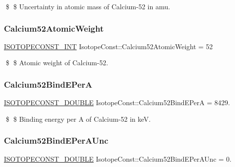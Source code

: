 \$ \$ Uncertainty in atomic mass of Calcium-\/52 in amu. \mbox{\label{group___isotope_const-_calcium-_ca52_ga20c2e65e41e31b8876894937d9915c74}} 
\subsubsection{\texorpdfstring{Calcium52\+Atomic\+Weight}{Calcium52AtomicWeight}}
{\footnotesize\ttfamily \mbox{\hyperlink{group___isotope_const-_macros_ga5f18360b3e99483a35c32d789e62621c}{I\+S\+O\+T\+O\+P\+E\+C\+O\+N\+S\+T\+\_\+\+I\+NT}} Isotope\+Const\+::\+Calcium52\+Atomic\+Weight = 52}

\$ \$ Atomic weight of Calcium-\/52. \mbox{\label{group___isotope_const-_calcium-_ca52_ga3cadfdd6e940544b8fb59bffe547830a}} 
\subsubsection{\texorpdfstring{Calcium52\+Bind\+E\+PerA}{Calcium52BindEPerA}}
{\footnotesize\ttfamily \mbox{\hyperlink{group___isotope_const-_macros_ga8f45a7272ce02c0b4c65c44636ed719a}{I\+S\+O\+T\+O\+P\+E\+C\+O\+N\+S\+T\+\_\+\+D\+O\+U\+B\+LE}} Isotope\+Const\+::\+Calcium52\+Bind\+E\+PerA = 8429.}

\$ \$ Binding energy per A of Calcium-\/52 in keV. \mbox{\label{group___isotope_const-_calcium-_ca52_ga85f8a4aa5c3ddd588b37051ce3956d1b}} 
\subsubsection{\texorpdfstring{Calcium52\+Bind\+E\+Per\+A\+Unc}{Calcium52BindEPerAUnc}}
{\footnotesize\ttfamily \mbox{\hyperlink{group___isotope_const-_macros_ga8f45a7272ce02c0b4c65c44636ed719a}{I\+S\+O\+T\+O\+P\+E\+C\+O\+N\+S\+T\+\_\+\+D\+O\+U\+B\+LE}} Isotope\+Const\+::\+Calcium52\+Bind\+E\+Per\+A\+Unc = 0.}

